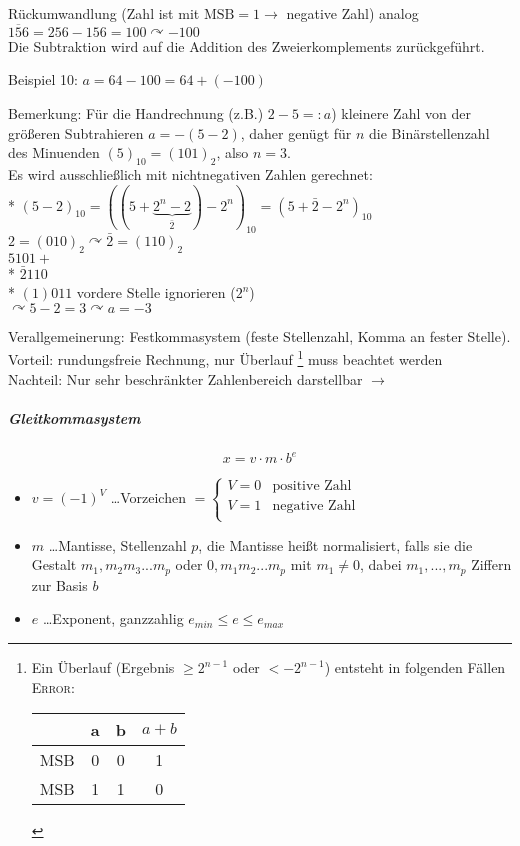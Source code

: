 \documentclass[a4paper]{scrartcl}
\begin{document}
Rückumwandlung (Zahl ist mit $\text{MSB}=1 \rightarrow$ negative Zahl) analog $\overline{156} = 256 -156=100 \curvearrowright -100$\\
Die Subtraktion wird auf die Addition des Zweierkomplements zurückgeführt.

Beispiel 10: $a=64-100=64+(-100)$


Bemerkung: Für die Handrechnung (z.B.) $2-5=:a$) kleinere Zahl von der größeren Subtrahieren $a=-(5-2)$, daher genügt für $n$ die Binärstellenzahl des Minuenden $(5)_{10} = (101)_2$, also $n=3$.\\
Es wird ausschließlich mit nichtnegativen Zahlen gerechnet:\\* $(5-2)_{10} = ((5+\underbrace{2^n -2}_{\bar{2}}) -2^n)_{10} = (5+\bar{2} - 2^n)_{10}$\\
$2=(010)_2 \curvearrowright \bar{2} = (110)_2$\\
$5          101 +$\\*%
$\bar{2}    110$\\*
$(1) 011$ vordere Stelle ignorieren ($2^n$)\\
$\curvearrowright 5-2 =3 \curvearrowright a=-3$

Verallgemeinerung: Festkommasystem (feste Stellenzahl, Komma an fester Stelle).\\
Vorteil: rundungsfreie Rechnung, nur Überlauf \footnote{
Ein Überlauf (Ergebnis $\geq 2^{n-1}$ oder $< -2^{n-1}$) entsteht in folgenden Fällen \textsc{Error}:
\begin{tabular}{c|c|c|c}
&a&b&$a+b$  \\ \hline
MSB&0&0&1\\ \hline
MSB&1&1&0\\
\end{tabular}
} muss beachtet werden\\

Nachteil: Nur sehr beschränkter Zahlenbereich darstellbar $\rightarrow$ 

\subparagraph{Gleitkommasystem}
\[x=v\cdot m \cdot b^e\]
\begin{itemize}
\item $v=(-1)^V$ \dots Vorzeichen $=\left\{ \begin{array}{rl}
         V=0
         & \mbox{positive Zahl}\\ 
         V=1  
         & \mbox{negative Zahl} \\
                \end{array}\right.$
                
\item $m$ \dots Mantisse, Stellenzahl $p$, die Mantisse heißt normalisiert, falls sie die Gestalt $m_1,m_2m_3 ... m_p$ oder $0,m_1 m_2 ... m_p$ mit $m_1 \neq 0$, dabei $m_1,...,m_p$ Ziffern zur Basis $b$
\item $e$ \dots Exponent, ganzzahlig $e_{min} \leq e \leq e_{max}$

\end{itemize}
\end{document}
